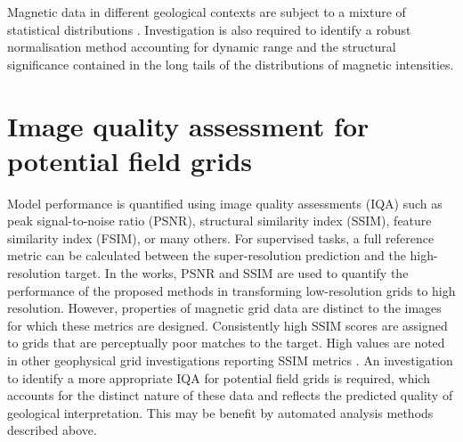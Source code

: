 Magnetic data in different geological contexts are subject to a mixture of statistical distributions \parencite{khokhlovCauseNonGaussianDistribution2017}. Investigation is also required to identify a robust normalisation method accounting for dynamic range and the structural significance contained in the long tails of the distributions of magnetic intensities.

\section{Image quality assessment for potential field grids}
Model performance is quantified using image quality assessments (IQA) such as peak signal-to-noise ratio (PSNR), structural similarity index (SSIM), feature similarity index (FSIM), or many others.
For supervised tasks, a full reference metric can be calculated between the super-resolution prediction and the high-resolution target.
In the  works, PSNR and SSIM are used to quantify the performance of the proposed methods in transforming low-resolution grids to high resolution.
However, properties of magnetic grid data are distinct to the images for which these metrics are designed.
Consistently high SSIM scores are assigned to grids that are perceptually poor matches to the target.
High values are noted in other geophysical grid investigations reporting SSIM metrics \parencite{wangDeeplearningbasedSeismicData2018,bavandsavadkoohiHighresolutionAeromagneticMap2023}.
An investigation to identify a more appropriate IQA for potential field grids is required, which accounts for the distinct nature of these data and reflects the predicted quality of geological interpretation.
This may be benefit by automated analysis methods described above.


